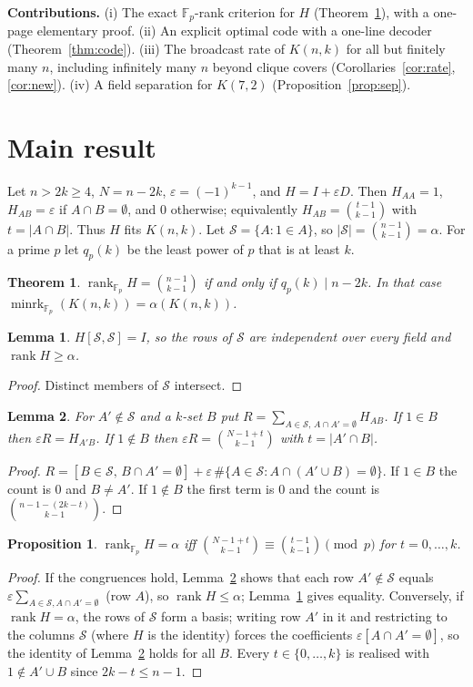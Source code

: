 \documentclass[conference]{IEEEtran}
\newtheorem{theorem}{Theorem}
\newtheorem{lemma}{Lemma}
\newtheorem{proposition}{Proposition}
\theoremstyle{remark}
\newcommand{\F}{\mathbb{F}}
\newcommand{\minrk}{\operatorname{minrk}}
\newcommand{\rank}{\operatorname{rank}}
\newcommand{\cS}{\mathcal{S}}
\begin{document}
\textbf{Contributions.} (i) The exact $\F_p$-rank criterion for $H$ (Theorem~\ref{thm:main}), with a one-page elementary
proof. (ii) An explicit optimal code with a one-line decoder (Theorem~\ref{thm:code}). (iii) The broadcast rate of $K(n,k)$
for all but finitely many $n$, including infinitely many $n$ beyond clique covers (Corollaries~\ref{cor:rate},
\ref{cor:new}). (iv) A field separation for $K(7,2)$ (Proposition~\ref{prop:sep}).

\section{Main result}
Let $n>2k\ge4$, $N=n-2k$, $\varepsilon=(-1)^{k-1}$, and $H=I+\varepsilon D$. Then $H_{AA}=1$, $H_{AB}=\varepsilon$ if
$A\cap B=\emptyset$, and $0$ otherwise; equivalently $H_{AB}=\binom{t-1}{k-1}$ with $t=|A\cap B|$. Thus $H$ fits $K(n,k)$.
Let $\cS=\{A:1\in A\}$, so $|\cS|=\binom{n-1}{k-1}=\alpha$. For a prime $p$ let $q_p(k)$ be the least power of $p$ that is
at least $k$.

\begin{theorem}\label{thm:main}
$\rank_{\F_p}H=\binom{n-1}{k-1}$ if and only if $q_p(k)\mid n-2k$. In that case $\minrk_{\F_p}(K(n,k))=\alpha(K(n,k))$.
\end{theorem}

\begin{lemma}\label{lem:star}
$H[\cS,\cS]=I$, so the rows of $\cS$ are independent over every field and $\rank H\ge\alpha$.
\end{lemma}
\begin{proof}
Distinct members of $\cS$ intersect.
\end{proof}

\begin{lemma}\label{lem:id}
For $A'\notin\cS$ and a $k$-set $B$ put $R=\sum_{A\in\cS,\,A\cap A'=\emptyset}H_{AB}$. If $1\in B$ then $\varepsilon R=H_{A'B}$.
If $1\notin B$ then $\varepsilon R=\binom{N-1+t}{k-1}$ with $t=|A'\cap B|$.
\end{lemma}
\begin{proof}
$R=[B\in\cS,\,B\cap A'=\emptyset]+\varepsilon\,\#\{A\in\cS:A\cap(A'\cup B)=\emptyset\}$. If $1\in B$ the count is $0$ and
$B\ne A'$. If $1\notin B$ the first term is $0$ and the count is $\binom{n-1-(2k-t)}{k-1}$.
\end{proof}

\begin{proposition}\label{prop:cong}
$\rank_{\F_p}H=\alpha$ iff $\binom{N-1+t}{k-1}\equiv\binom{t-1}{k-1}\pmod p$ for $t=0,\dots,k$.
\end{proposition}
\begin{proof}
If the congruences hold, Lemma~\ref{lem:id} shows that each row $A'\notin\cS$ equals $\varepsilon\sum_{A\in\cS,A\cap A'=\emptyset}$
(row $A$), so $\rank H\le\alpha$; Lemma~\ref{lem:star} gives equality. Conversely, if $\rank H=\alpha$, the rows of $\cS$
form a basis; writing row $A'$ in it and restricting to the columns $\cS$ (where $H$ is the identity) forces the
coefficients $\varepsilon[A\cap A'=\emptyset]$, so the identity of Lemma~\ref{lem:id} holds for all $B$. Every
$t\in\{0,\dots,k\}$ is realised with $1\notin A'\cup B$ since $2k-t\le n-1$.
\end{proof}
\end{document}
